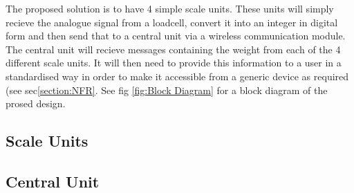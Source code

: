 The proposed solution is to have 4 simple scale units. These units will simply recieve the analogue signal from a loadcell, convert it into an integer in digital form and then send that to a central unit via a wireless communication module. The central unit will recieve messages containing the weight from each of the 4 different scale units. It will then need to provide this information to a user in a standardised way in order to make it accessible from a generic device as required (see sec\ref{section:NFR}. See fig \ref{fig:Block Diagram} for a block diagram of the prosed design.

\subsection{Scale Units}
\label{scale}

\subsection{Central Unit}
\label{central}

